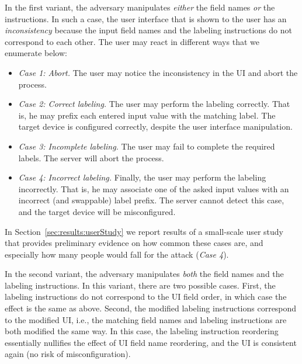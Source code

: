 In the first variant, the adversary manipulates \emph{either} the field names \emph{or} the instructions. In such a case, the user interface that is shown to the user has an \emph{inconsistency} because the input field names and the labeling instructions do not correspond to each other. The user may react in different ways that we enumerate below:
\begin{itemize}
    \item \emph{Case 1: Abort.} The user may notice the inconsistency in the UI and abort the process. \label{detect}
    
    \item \emph{Case 2: Correct labeling.} The user may perform the labeling correctly. That is, he may prefix each entered input value with the matching label. The target device is configured correctly, despite the user interface manipulation.\label{notdetect}
    
    
    \item \emph{Case 3: Incomplete labeling.} The user may fail to complete the required labels. The server will abort the process. 
    
    \item \emph{Case 4: Incorrect labeling.} Finally, the user may perform the labeling incorrectly. That is, he may associate one of the asked input values with an incorrect (and swappable) label prefix. The server cannot detect this case, and the target device will be misconfigured. \label{kaboom}
\end{itemize}

In Section~\ref{sec:results:userStudy} we report results of a small-scale user study that provides preliminary evidence on how common these cases are, and especially how many people would fall for the attack (\emph{Case 4}).


In the second variant, the adversary manipulates \emph{both} the field names and the labeling instructions. In this variant, there are two possible cases. First, the labeling instructions do not correspond to the UI field order, in which case the effect is the same as above. Second, the modified labeling instructions correspond to the modified UI, i.e., the matching field names and labeling instructions are both modified the same way. In this case, the labeling instruction reordering essentially nullifies the effect of UI field name reordering, and the UI is consistent again (no risk of misconfiguration).


